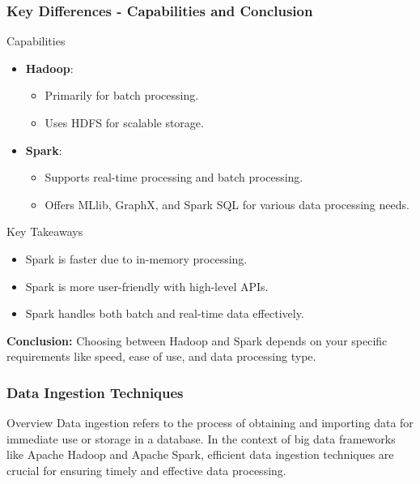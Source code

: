 \documentclass{beamer}
\begin{document}
\begin{frame}[fragile]
    \frametitle{Key Differences - Capabilities and Conclusion}
    \begin{block}{Capabilities}
        \begin{itemize}
            \item \textbf{Hadoop}:
                \begin{itemize}
                    \item Primarily for batch processing.
                    \item Uses HDFS for scalable storage.
                \end{itemize}
            \item \textbf{Spark}:
                \begin{itemize}
                    \item Supports real-time processing and batch processing.
                    \item Offers MLlib, GraphX, and Spark SQL for various data processing needs.
                \end{itemize}
        \end{itemize}
    \end{block}
    
    \begin{block}{Key Takeaways}
        \begin{itemize}
            \item Spark is faster due to in-memory processing.
            \item Spark is more user-friendly with high-level APIs.
            \item Spark handles both batch and real-time data effectively.
        \end{itemize}
    \end{block}
    
    \textbf{Conclusion:} Choosing between Hadoop and Spark depends on your specific requirements like speed, ease of use, and data processing type.
\end{frame}

\begin{frame}[fragile]
    \frametitle{Data Ingestion Techniques}
    \begin{block}{Overview}
        Data ingestion refers to the process of obtaining and importing data for immediate use or storage in a database. In the context of big data frameworks like Apache Hadoop and Apache Spark, efficient data ingestion techniques are crucial for ensuring timely and effective data processing.
    \end{block}
\end{frame}
\end{document}
